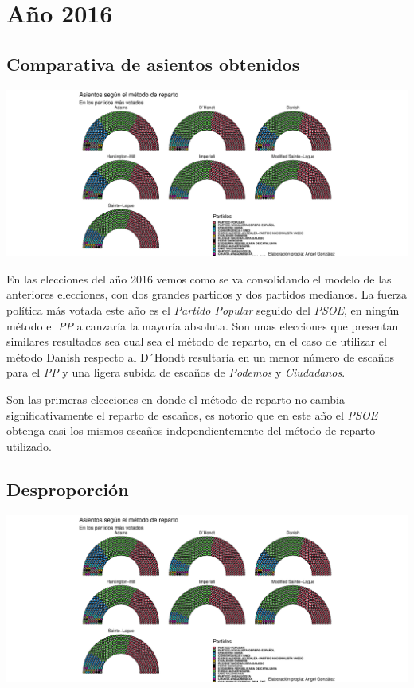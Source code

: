 \documentclass[12pt,a4paper,]{book}
\numberwithin{dummy}{section}
\theoremstyle{ocrenumbox}
\theoremstyle{blacknumex}
\theoremstyle{blacknumbox}
\theoremstyle{ocrenum}
\theoremstyle{ocrenum}
\begin{document}
\hypertarget{auxf1o-2016}{%
\section{Año 2016}\label{auxf1o-2016}}

\hypertarget{comparativa-de-asientos-obtenidos-12}{%
\subsection{Comparativa de asientos
obtenidos}\label{comparativa-de-asientos-obtenidos-12}}

\begin{center}\includegraphics[width=1\linewidth]{figurasR/unnamed-chunk-114-1} \end{center}

En las elecciones del año 2016 vemos como se va consolidando el modelo
de las anteriores elecciones, con dos grandes partidos y dos partidos
medianos. La fuerza política más votada este año es el \emph{Partido
Popular} seguido del \emph{PSOE}, en ningún método el \emph{PP}
alcanzaría la mayoría absoluta. Son unas elecciones que presentan
similares resultados sea cual sea el método de reparto, en el caso de
utilizar el método Danish respecto al D´Hondt resultaría en un menor
número de escaños para el \emph{PP} y una ligera subida de escaños de
\emph{Podemos} y \emph{Ciudadanos}.

Son las primeras elecciones en donde el método de reparto no cambia
significativamente el reparto de escaños, es notorio que en este año el
\emph{PSOE} obtenga casi los mismos escaños independientemente del
método de reparto utilizado.

\hypertarget{desproporciuxf3n-12}{%
\subsection{Desproporción}\label{desproporciuxf3n-12}}

\begin{center}\includegraphics[width=1\linewidth]{figurasR/unnamed-chunk-115-1} \end{center}
\end{document}
